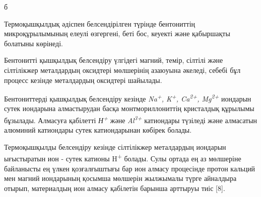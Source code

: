 \begin{table}[H]
\centering
{}
\caption*{б}
\caption*{4-сурет - Термоқышқылдық жолмен белсендендірілген бентониттің микроқұрылымы (а), энергодисперсиондық спектрі (ә), элементтік талдау (б) нәтижелері}
\end{table}

Термоқышқылдық әдіспен белсендірілген түрінде бентониттің
микроқұрылымының елеулі өзгергені, беті бос, кеуекті және қабыршақты
болатыны көрінеді.

Бентонитті қышқылдық белсендіру үлгідегі магний, темір, сілтілі және
сілтілікжер металдардың оксидтері мөлшерінің азаюуына әкеледі, себебі
бұл процесс кезінде металдардың оксидтері шайылады.

Бентониттерді қышқылдық белсендіру кезінде \emph{Na\textsuperscript{+},
K\textsuperscript{+}, Ca\textsuperscript{2+}, Mg\textsuperscript{2+}}
иондарын сутек иондарына алмастырудан басқа монтмориллониттің кристалдық
құрылымы бұзылады. Алмасуға қабілетті \emph{Н\textsuperscript{+}} және
\emph{Al\textsuperscript{3+ }}катиондары түзіледі және алмасатын
алюминий катиондары сутек катиондарынан көбірек болады.

Термоқышқылды белсендіру кезінде сілтілікжер металдардың иондарын
ығыстыратын ион - сутек катионы H\textsuperscript{+} болады. Сулы ортада
ең аз мөлшеріне байланысты ең үлкен қозғалғыштығы бар ион алмасу
процесінде протон кальций мен магний иондарының қосымша мөлшерін
жылжымалы түрге айналдыра отырып, материалдың ион алмасу қабілетін
барынша арттыруы тиіс {[}8{]}.

